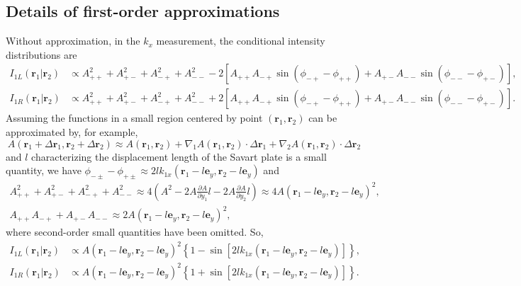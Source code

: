 \documentclass[pra,english,reprint,nofootinbib,aps,superscriptaddress,showpacs,showkeys]{revtex4-2}
\theoremstyle{definition}
\theoremstyle{remark}
\begin{document}
	\appendix
	\begin{widetext}
		\section{Details of first-order approximations}\label{appA}
		
		Without approximation, in the $k_x$ measurement, the conditional intensity distributions are
		\begin{align}\label{condint}
			I_{1L}(\mathbf{r}_1|\mathbf{r}_2)&\propto A^2_{++}+A^2_{+-}+A^2_{-+}+A^2_{--}-2\left[A_{++}A_{-+}\sin(\phi_{-+}-\phi_{++})+A_{+-}A_{--}\sin(\phi_{--}-\phi_{+-})\right],\nonumber\\
			I_{1R}(\mathbf{r}_1|\mathbf{r}_2)&\propto A^2_{++}+A^2_{+-}+A^2_{-+}+A^2_{--}+2\left[A_{++}A_{-+}\sin(\phi_{-+}-\phi_{++})+A_{+-}A_{--}\sin(\phi_{--}-\phi_{+-})\right].
		\end{align}
		Assuming the functions in a small region centered by point $(\mathbf{r}_1,\mathbf{r}_2)$ can be approximated by, for example,
		\begin{equation}
			A(\mathbf{r}_1+\Delta\mathbf{r}_1,\mathbf{r}_2+\Delta\mathbf{r}_2)\approx A(\mathbf{r}_1,\mathbf{r}_2)+\nabla_1 A(\mathbf{r}_1,\mathbf{r}_2)\cdot\Delta\mathbf{r}_1+\nabla_2 A(\mathbf{r}_1,\mathbf{r}_2)\cdot\Delta\mathbf{r}_2
		\end{equation}
		and $l$ characterizing the displacement length of the Savart plate is a small quantity, we have $\phi_{-\pm}-\phi_{+\pm}\approx2lk_{1x}(\mathbf{r}_1-l\mathbf{e}_y,\mathbf{r}_2-l\mathbf{e}_y)$ and
		\begin{gather}
			A^2_{++}+A^2_{+-}+A^2_{-+}+A^2_{--}\approx 4\left(A^2-2A\frac{\partial A}{\partial y_1}l-2A\frac{\partial A}{\partial y_2}l\right)\approx 4A(\mathbf{r}_1-l\mathbf{e}_y,\mathbf{r}_2-l\mathbf{e}_y)^2,\nonumber\\
			A_{++}A_{-+}+A_{+-}A_{--}\approx 2A(\mathbf{r}_1-l\mathbf{e}_y,\mathbf{r}_2-l\mathbf{e}_y)^2,
		\end{gather}
		where second-order small quantities have been omitted. So,
		\begin{align}\label{condintres1}
			I_{1L}(\mathbf{r}_1|\mathbf{r}_2)&\propto A(\mathbf{r}_1-l\mathbf{e}_y,\mathbf{r}_2-l\mathbf{e}_y)^2\left\{1-\sin[2lk_{1x}(\mathbf{r}_1-l\mathbf{e}_y,\mathbf{r}_2-l\mathbf{e}_y)]\right\},\nonumber\\
			I_{1R}(\mathbf{r}_1|\mathbf{r}_2)&\propto A(\mathbf{r}_1-l\mathbf{e}_y,\mathbf{r}_2-l\mathbf{e}_y)^2\left\{1+\sin[2lk_{1x}(\mathbf{r}_1-l\mathbf{e}_y,\mathbf{r}_2-l\mathbf{e}_y)]\right\}.
		\end{align}
		

\end{widetext}
\end{document}
